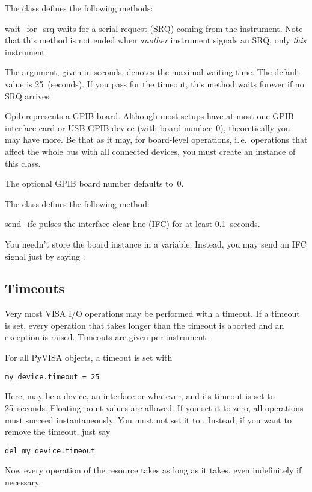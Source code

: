 \documentclass{howto}
\begin{document}
The class  defines the following methods:

\begin{methoddesc}{wait_for_srq}{}
  waits for a serial request (SRQ) coming from the instrument.  Note that this
  method is not ended when \emph{another} instrument signals an SRQ, only
  \emph{this} instrument.
  
  The  argument, given in seconds, denotes the maximal waiting
  time.  The default value is 25~(seconds).  If you pass  for the
  timeout, this method waits forever if no SRQ arrives.
\end{methoddesc}

\bigskip
\begin{classdesc}{Gpib}{}
  represents a GPIB board.  Although most setups have at most one GPIB
  interface card or USB-GPIB device (with board number~0), theoretically you
  may have more.  Be that as it may, for board-level operations, i.\,e.\
  operations that affect the whole bus with all connected devices, you must
  create an instance of this class.

  The optional GPIB board number  defaults to~0.
\end{classdesc}

The class  defines the following method:

\begin{methoddesc}{send_ifc}{}
  pulses the interface clear line (IFC) for at least 0.1~seconds.
\end{methoddesc}

\begin{notice}
You needn't store the board instance in a variable.  Instead, you may send an
IFC signal just by saying \samp{Gpib().send_ifc()}.
\end{notice}


\subsection{Timeouts}
\label{sec:timeouts}

Very most VISA I/O operations may be performed with a timeout.  If a timeout is
set, every operation that takes longer than the timeout is aborted and an
exception is raised.  Timeouts are given per instrument.

For all PyVISA objects, a timeout is set with
\begin{verbatim}
my_device.timeout = 25
\end{verbatim}
Here,  may be a device, an interface or whatever, and its
timeout is set to 25~seconds.  Floating-point values are allowed.  If you set
it to zero, all operations must succeed instantaneously.  You must not set it
to \code{None}.  Instead, if you want to remove the timeout, just say
\begin{verbatim}
del my_device.timeout
\end{verbatim}
Now every operation of the resource takes as long as it takes, even
indefinitely if necessary.
\end{document}
